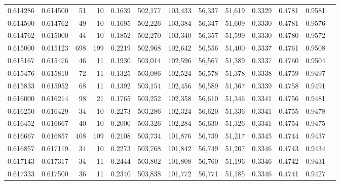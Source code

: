 \begin{tabular}{rrrrrrrrrrrrr}
0.614286 & 0.614500 &    51 &  10 &                                     0.1639 & 502,177 & 103,433 &  56,337 &  51,619 & 0.3329 & 0.4781 & 0.9581 \\
0.614500 & 0.614762 &    49 &  10 &                                     0.1695 & 502,226 & 103,384 &  56,347 &  51,609 & 0.3330 & 0.4781 & 0.9576 \\
0.614762 & 0.615000 &    44 &  10 &                                     0.1852 & 502,270 & 103,340 &  56,357 &  51,599 & 0.3330 & 0.4780 & 0.9572 \\
0.615000 & 0.615123 &   698 & 199 &                                     0.2219 & 502,968 & 102,642 &  56,556 &  51,400 & 0.3337 & 0.4761 & 0.9508 \\
0.615167 & 0.615476 &    46 &  11 &                                     0.1930 & 503,014 & 102,596 &  56,567 &  51,389 & 0.3337 & 0.4760 & 0.9504 \\
0.615476 & 0.615810 &    72 &  11 &                                     0.1325 & 503,086 & 102,524 &  56,578 &  51,378 & 0.3338 & 0.4759 & 0.9497 \\
0.615833 & 0.615952 &    68 &  11 &                                     0.1392 & 503,154 & 102,456 &  56,589 &  51,367 & 0.3339 & 0.4758 & 0.9491 \\
0.616000 & 0.616214 &    98 &  21 &                                     0.1765 & 503,252 & 102,358 &  56,610 &  51,346 & 0.3341 & 0.4756 & 0.9481 \\
0.616250 & 0.616429 &    34 &  10 &                                     0.2273 & 503,286 & 102,324 &  56,620 &  51,336 & 0.3341 & 0.4755 & 0.9478 \\
0.616452 & 0.616667 &    40 &  10 &                                     0.2000 & 503,326 & 102,284 &  56,630 &  51,326 & 0.3341 & 0.4754 & 0.9475 \\
0.616667 & 0.616857 &   408 & 109 &                                     0.2108 & 503,734 & 101,876 &  56,739 &  51,217 & 0.3345 & 0.4744 & 0.9437 \\
0.616857 & 0.617119 &    34 &  10 &                                     0.2273 & 503,768 & 101,842 &  56,749 &  51,207 & 0.3346 & 0.4743 & 0.9434 \\
0.617143 & 0.617317 &    34 &  11 &                                     0.2444 & 503,802 & 101,808 &  56,760 &  51,196 & 0.3346 & 0.4742 & 0.9431 \\
0.617333 & 0.617500 &    36 &  11 &                                     0.2340 & 503,838 & 101,772 &  56,771 &  51,185 & 0.3346 & 0.4741 & 0.9427 \\

\end{tabular}
